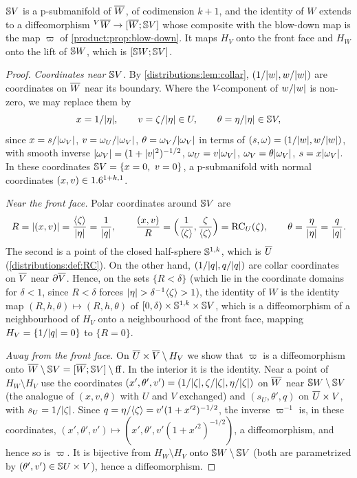 \begin{theorem}\label{blowup:thm:relative}
$\mathbb{S} V$ is a p-submanifold of $\overline{W}$, of codimension $k+1$, and the identity of $W$
extends to a diffeomorphism ${}^{V}\overline{W}\to[\overline{W};\mathbb{S} V]$ whose composite with the
blow-down map is the map $\varpi$ of \cref{product:prop:blow-down}. It maps $H_V$ onto
the front face and $H_W$ onto the lift of $\mathbb{S} W$, which is $[\mathbb{S} W;\mathbb{S} V]$.
\end{theorem}
\begin{proof}
\emph{Coordinates near $\mathbb{S} V$.} By \cref{distributions:lem:collar}, $(1/\lvert w\rvert,w/\lvert w\rvert)$ are coordinates on $\overline{W}$ near its boundary. Where the $V$-component of $w/\lvert w\rvert$
is non-zero, we may replace them by
\begin{equation*}
  x=1/\lvert \eta\rvert,\qquad v=\zeta/\lvert \eta\rvert\in U,\qquad\theta=\eta/\lvert \eta\rvert\in\mathbb{S} V,
\end{equation*}
since $x=s/\lvert \omega_V\rvert$, $v=\omega_U/\lvert \omega_V\rvert$, $\theta=\omega_V/\lvert \omega_V\rvert$ in
terms of $(s,\omega)=(1/\lvert w\rvert,w/\lvert w\rvert)$, with smooth inverse
$\lvert \omega_V\rvert=(1+\lvert v\rvert^2)^{-1/2}$, $\omega_U=v\lvert \omega_V\rvert$, $\omega_V=\theta\lvert \omega_V\rvert$,
$s=x\lvert \omega_V\rvert$. In these coordinates $\mathbb{S} V=\{x=0,\ v=0\}$, a p-submanifold with
normal coordinates $(x,v)\in1.6^{1+k,1}$.

\emph{Near the front face.} Polar coordinates around $\mathbb{S} V$ are
\begin{equation*}
  R=\lvert (x,v)\rvert=\frac{\langle \zeta\rangle}{\lvert \eta\rvert}=\frac1{\lvert q\rvert},\qquad
  \frac{(x,v)}R=\Big(\frac1{\langle \zeta\rangle},\frac\zeta{\langle \zeta\rangle}\Big)=\mathrm{RC}_U(\zeta),\qquad
  \theta=\frac{\eta}{\lvert \eta\rvert}=\frac q{\lvert q\rvert}.
\end{equation*}
The second is a point of the closed half-sphere $\mathbb{S}^{1,k}$, which is $\overline{U}$
(\cref{distributions:def:RC}). On the other hand, $(1/\lvert q\rvert,q/\lvert q\rvert)$ are collar
coordinates on $\overline{V}$ near $\partial\overline{V}$. Hence, on the sets $\{R<\delta\}$ (which lie in the
coordinate domains for $\delta<1$, since $R<\delta$ forces $\lvert \eta\rvert>\delta^{-1}\langle \zeta\rangle>1$), the identity
of $W$ is the identity map $(R,h,\theta)\mapsto(R,h,\theta)$ of $[0,\delta)\times\mathbb{S}^{1,k}
\times\mathbb{S} V$, which is a diffeomorphism of a neighbourhood of $H_V$ onto a neighbourhood
of the front face, mapping $H_V=\{1/\lvert q\rvert=0\}$ to $\{R=0\}$.

\emph{Away from the front face.} On $\overline{U}\times\overline{V}\setminus H_V$ we show that $\varpi$
is a diffeomorphism onto $\overline{W}\setminus\mathbb{S} V=[\overline{W};\mathbb{S} V]\setminus\mathrm{ff}$. In the
interior it is the identity. Near a point of $H_W\setminus H_V$ use the coordinates
$(x',\theta',v')=(1/\lvert \zeta\rvert,\zeta/\lvert \zeta\rvert,\eta/\lvert \zeta\rvert)$ on $\overline{W}$ near $\mathbb{S} W\setminus\mathbb{S} V$
(the analogue of $(x,v,\theta)$ with $U$ and $V$ exchanged) and $(s_U,\theta',q)$ on
$\overline{U}\times V$, with $s_U=1/\lvert \zeta\rvert$. Since $q=\eta/\langle \zeta\rangle=v'(1+x'^2)^{-1/2}$, the
inverse $\varpi^{-1}$ is, in these coordinates, $(x',\theta',v')\mapsto(x',\theta',v'(1+x'^2)^{-1/2})$,
a diffeomorphism, and hence so is $\varpi$. It is bijective
from $H_W\setminus H_V$ onto $\mathbb{S} W\setminus\mathbb{S} V$ (both are parametrized by
$(\theta',v')\in\mathbb{S} U\times V$), hence a diffeomorphism.


\end{proof}
